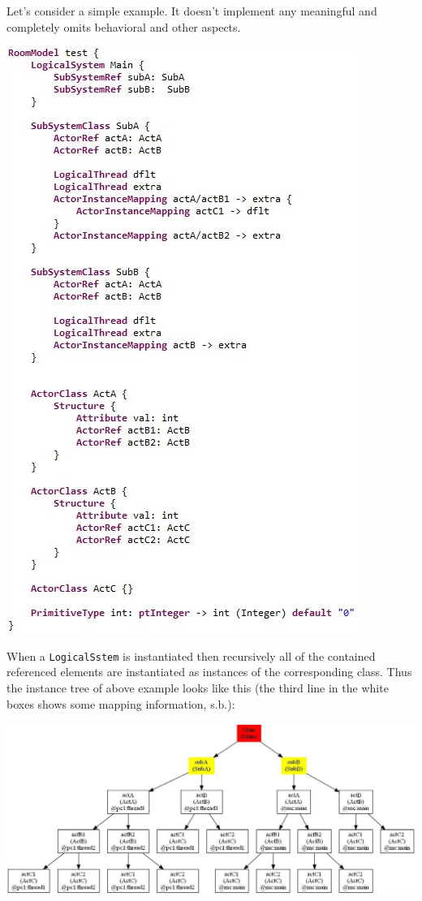 Let's consider a simple example. It doesn't implement any meaningful and completely omits behavioral and other aspects.

\includegraphics{images/080-room.jpg}

When a \texttt{LogicalSstem} is instantiated then recursively all of the contained referenced elements are instantiated as instances of the corresponding class. Thus the instance tree of above example looks like this (the third line in the white boxes shows some mapping information, s.b.):

\includegraphics[scale=0.45]{images/080-instances.jpg}


